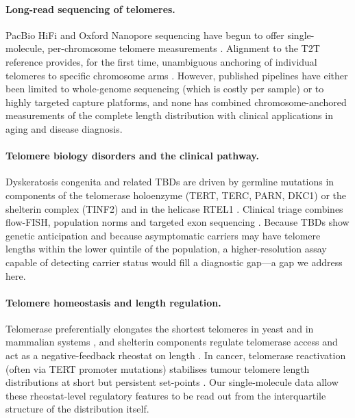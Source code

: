 \paragraph{Long-read sequencing of telomeres.} PacBio HiFi and Oxford Nanopore sequencing have begun to offer single-molecule, per-chromosome telomere measurements \cite{tham2023comprehensive,schmidt2023targeted,karimian2024human,heller2019telomeres}. Alignment to the T2T reference provides, for the first time, unambiguous anchoring of individual telomeres to specific chromosome arms \cite{nurk2022complete}. However, published pipelines have either been limited to whole-genome sequencing (which is costly per sample) or to highly targeted capture platforms, and none has combined chromosome-anchored measurements of the complete length distribution with clinical applications in aging and disease diagnosis.

\paragraph{Telomere biology disorders and the clinical pathway.} Dyskeratosis congenita and related TBDs are driven by germline mutations in components of the telomerase holoenzyme (TERT, TERC, PARN, DKC1) or the shelterin complex (TINF2) and in the helicase RTEL1 \cite{tummala2015poly,walne2013constitutional,savage2008tinf2,armanios2012telomeres,bertuch2016molecular}. Clinical triage combines flow-FISH, population norms and targeted exon sequencing \cite{alder2018diagnostic}. Because TBDs show genetic anticipation and because asymptomatic carriers may have telomere lengths within the lower quintile of the population, a higher-resolution assay capable of detecting carrier status would fill a diagnostic gap---a gap we address here.

\paragraph{Telomere homeostasis and length regulation.} Telomerase preferentially elongates the shortest telomeres in yeast and in mammalian systems \cite{teixeira2004intertelomere,hemann2001shortest,britt2012preferential}, and shelterin components regulate telomerase access and act as a negative-feedback rheostat on length \cite{palm2008howshelterin,hockemeyer2015control}. In cancer, telomerase reactivation (often via TERT promoter mutations) stabilises tumour telomere length distributions at short but persistent set-points \cite{chiba2015cancer,barthel2017systematic}. Our single-molecule data allow these rheostat-level regulatory features to be read out from the interquartile structure of the distribution itself.
